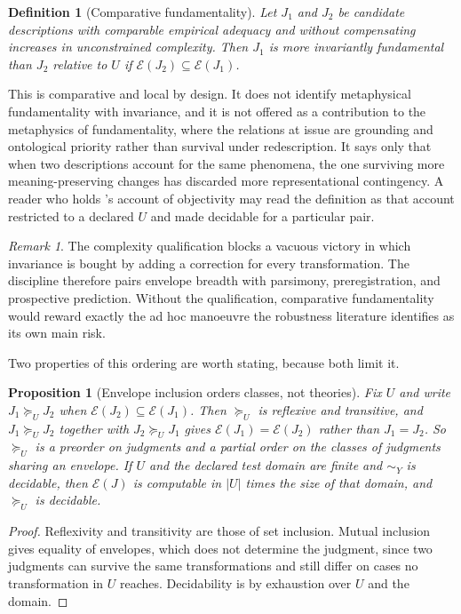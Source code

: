 \documentclass[11pt]{article}
\newtheorem{definition}{Definition}
\newtheorem{proposition}{Proposition}
\theoremstyle{remark}
\newtheorem{remark}{Remark}
\begin{document}
\begin{definition}[Comparative fundamentality]
Let $J_1$ and $J_2$ be candidate descriptions with comparable empirical adequacy
and without compensating increases in unconstrained complexity. Then $J_1$ is more
invariantly fundamental than $J_2$ relative to $U$ if
$\mathcal{E}(J_2) \subseteq \mathcal{E}(J_1)$.
\end{definition}

This is comparative and local by design. It does not identify metaphysical
fundamentality with invariance, and it is not offered as a contribution to the
metaphysics of fundamentality, where the relations at issue are grounding and
ontological priority rather than survival under redescription. It says only that
when two descriptions account for the same phenomena, the one surviving more
meaning-preserving changes has discarded more representational contingency. A
reader who holds \citeauthor{nozick2001}'s \citeyearpar{nozick2001} account of
objectivity may read the definition as that account restricted to a declared $U$
and made decidable for a particular pair.

\begin{remark}
The complexity qualification blocks a vacuous victory in which invariance is bought
by adding a correction for every transformation. The discipline therefore pairs
envelope breadth with parsimony, preregistration, and prospective prediction.
Without the qualification, comparative fundamentality would reward exactly the ad
hoc manoeuvre the robustness literature identifies as its own main risk.
\end{remark}

Two properties of this ordering are worth stating, because both limit it.

\begin{proposition}[Envelope inclusion orders classes, not theories]
Fix $U$ and write $J_1 \succeq_U J_2$ when $\mathcal{E}(J_2) \subseteq
\mathcal{E}(J_1)$. Then $\succeq_U$ is reflexive and transitive, and
$J_1 \succeq_U J_2$ together with $J_2 \succeq_U J_1$ gives
$\mathcal{E}(J_1) = \mathcal{E}(J_2)$ rather than $J_1 = J_2$. So $\succeq_U$ is a
preorder on judgments and a partial order on the classes of judgments sharing an
envelope. If $U$ and the declared test domain are finite and $\sim_Y$ is decidable,
then $\mathcal{E}(J)$ is computable in $|U|$ times the size of that domain, and
$\succeq_U$ is decidable.
\end{proposition}

\begin{proof}
Reflexivity and transitivity are those of set inclusion. Mutual inclusion gives
equality of envelopes, which does not determine the judgment, since two judgments
can survive the same transformations and still differ on cases no transformation in
$U$ reaches. Decidability is by exhaustion over $U$ and the domain.
\end{proof}
\end{document}
